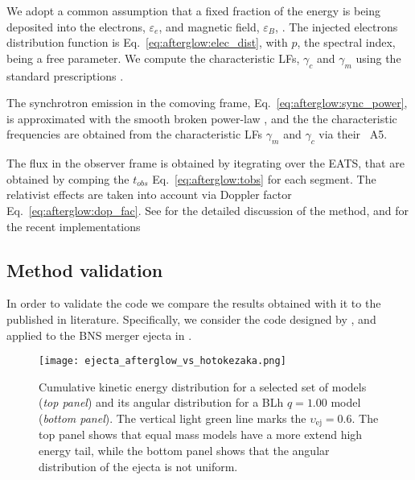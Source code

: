 We adopt a common assumption that a fixed fraction of the \blast{} energy is being
deposited into the electrons, $\varepsilon_e$, and magnetic field, $\varepsilon_B$, 
\citep[\eg][]{Dermer:1997pv}. 
The injected electrons distribution function is Eq.~\eqref{eq:afterglow:elec_dist},
with $p$, the spectral index, being a free parameter.
%
We compute the characteristic \acp{LF}, $\gamma_c$ and $\gamma_m$ using the standard
prescriptions \citep[\eqs~A3 and A4 in][respectively]{Johannesson:2006zs}.

The synchrotron emission in the comoving frame, Eq.~\eqref{eq:afterglow:sync_power},
is approximated with the smooth broken power-law  
\citep[\eqs~A2 and A6 in][respectively]{Johannesson:2006zs}, and the 
the characteristic frequencies are obtained from the characteristic \acp{LF} 
$\gamma_{m}$ and $\gamma_c$ via their \eq~A5.
%
%

The flux in the observer frame is obtained by itegrating over the \ac{EATS}, 
that are obtained by comping the $t_{obs}$ Eq.~\eqref{eq:afterglow:tobs} for each
segment. The relativist effects are taken into account via 
Doppler factor Eq.~\eqref{eq:afterglow:dop_fac}.
See \citet{Salmonson:2003} for the detailed discussion of the method, 
and \citet{Lamb:2018ohw,Fernandez:2021xce} for the recent implementations


\subsection{Method validation}

In order to validate the code we compare the results obtained with it to the  
published in literature. Specifically, we consider the code designed by \citet{Hotokezaka:2015eja},
and applied to the \ac{BNS} merger ejecta in \citet{Radice:2018pdn}.

\begin{figure}%
    \centering 
    \texttt{[image: ejecta\_afterglow\_vs\_hotokezaka.png]}
    \caption{
        Cumulative kinetic energy distribution for a selected set of models (\textit{top panel}) 
        and its angular distribution for a BLh $q=1.00$ model (\textit{bottom panel}).
        The vertical light green line marks the $\upsilon_{\text{ej}}=0.6$.
        The top panel shows that equal mass models have a more extend high energy tail,
        while the bottom panel shows that the angular distribution of the ejecta is not 
        uniform.
    } 
    \label{fig:afg_test}
\end{figure}


